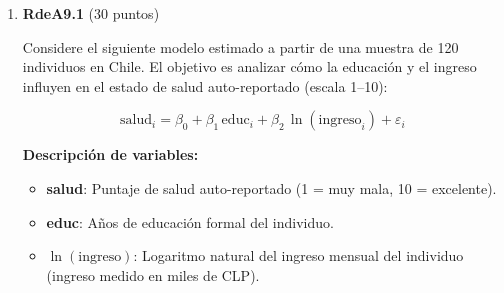 \documentclass[10pt,a4paper]{article}
\begin{document}
\begin{enumerate}
{\begin{enumerate}
En un modelo semilogarítmico:
\[
\Delta \log(\text{salary}) \approx \hat{\beta}_3 \cdot \Delta \texttt{ros}
\]
\[
\Rightarrow 100 \times 0.0024 \times 50 = 12.0\% \text{ (aproximación lineal)}
\]
\[
\text{Ajuste exacto: } 100 \times [\exp(0.0024 \times 50) - 1] \approx 12.75\%
\]

El efecto estimado no es estadísticamente significativo (\(t = 0.44\)), por lo que no puede concluirse que un aumento en \texttt{ros} eleve el salario de los CEO.

\item \textbf{Prueba de significancia conjunta para \texttt{roe} y \texttt{ros}}

\[
H_0: \beta_2 = \beta_3 = 0 \qquad \text{vs.} \qquad H_1: \text{al menos uno distinto de cero.}
\]

Se tiene:
\[
R^2_{UR} = 0.283, \quad R^2_{R} = 0.279, \quad q = 2, \quad n = 209, \quad k_{UR}=3.
\]

El estadístico \(F\) es:
\[
F = \frac{(R^2_{UR}-R^2_R)/q}{(1-R^2_{UR})/(n-k_{UR}-1)} 
  = \frac{(0.283-0.279)/2}{(1-0.283)/205} 
  = \frac{0.002}{0.00350} = 0.57.
\]

Valores críticos: \(F_{0.90}(2,205) = 2.35\)  

\item Ni individualmente ni conjuntamente las variables \texttt{roe} y \texttt{ros} resultan estadísticamente significativas al 10\%.  
El incremento en el coeficiente de determinación es mínimo ($R^2$: 0.279 $\rightarrow$ 0.283). 
Por lo tanto, desde un criterio de parsimonia y significancia, \textbf{no se recomienda incluir \texttt{roe} y \texttt{ros}} en el modelo final que explica el salario de los CEO en función del desempeño de la empresa.  


\end{enumerate}
}



 \item \textbf{RdeA9.1} (30 puntos)  

 Considere el siguiente modelo estimado a partir de una muestra de 120 individuos en Chile.  
El objetivo es analizar cómo la educación y el ingreso influyen en el estado de salud auto-reportado (escala 1–10):

\[
\mathrm{salud}_i = \beta_0 + \beta_1\,\mathrm{educ}_i + \beta_2\,\ln(\mathrm{ingreso}_i) + \varepsilon_i
\]

\noindent
\textbf{Descripción de variables:}
\begin{itemize}
    \item \textbf{salud}: Puntaje de salud auto-reportado (1 = muy mala, 10 = excelente).
    \item \textbf{educ}: Años de educación formal del individuo.
    \item \textbf{$\ln(\mathrm{ingreso})$}: Logaritmo natural del ingreso mensual del individuo (ingreso medido en miles de CLP).
\end{itemize}


\end{enumerate}
\end{document}

